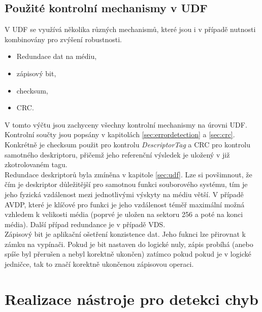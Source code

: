\section{Použité kontrolní mechanismy v UDF}
\label{sec:howtolabelthat}
V UDF se využívá několika různých mechanismů, které jsou i v případě nutnosti kombinovány pro zvýšení robustnosti.
\begin{itemize}
    \item Redundace dat na médiu,
    \item zápisový bit,
    \item checksum,
    \item CRC.
\end{itemize}
V tomto výčtu jsou zachyceny všechny kontrolní mechanismy na úrovni UDF. Kontrolní součty jsou popsány v kapitolách \ref{sec:errordetection} a \ref{sec:crc}. Konkrétně je checksum použit pro kontrolu \textit{DescriptorTag} a CRC pro kontrolu samotného deskriptoru, přičemž jeho referenční výsledek je uložený v již zkotrolovaném tagu.\\
Redundace deskriptorů byla zmíněna v kapitole \ref{sec:udf}. Lze si povšimnout, že čím je deskriptor důležitější pro samotnou funkci souborového systému, tím je jeho fyzická vzdálenost mezi jednotlivými výskyty na médiu větší. V případě AVDP, které je klíčové pro funkci je jeho vzdálenost téměř maximální možná vzhledem k velikosti média (poprvé je uložen na sektoru 256 a poté na konci média). Další případ redundance je v případě VDS.\\
Zápisový bit je aplikační ošetření konzistence dat. Jeho fuknci lze přirovnat k zámku na vypínači. Pokud je bit nastaven do logické nuly, zápis probíhá (anebo spíše byl přerušen a nebyl korektně ukončen) zatímco pokud pokud je v logické jedničce, tak to značí korektně ukončenou zápisovou operaci.

\chapter{Realizace nástroje pro detekci chyb}
